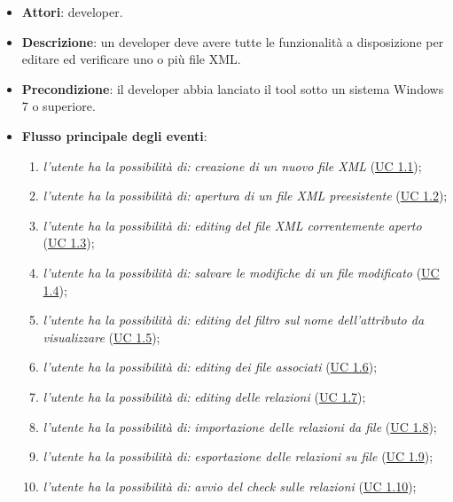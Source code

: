 		\begin{itemize}
			\item\textbf{Attori}: developer.
			\item\textbf{Descrizione}: un developer deve avere tutte le funzionalità a disposizione per editare ed verificare uno o più file XML.
			\item\textbf{Precondizione}: il developer abbia lanciato il tool sotto un sistema Windows 7 o superiore.
			\item\textbf{Flusso principale degli eventi}: 
			\begin{enumerate}
				\item \textit{l'utente ha la possibilità di:} \textit{creazione di un nuovo file XML} (\hyperref[subsec:XEUC1.1]{UC 1.1});
				
				\item \textit{l'utente ha la possibilità di:} \textit{apertura di un file XML preesistente} (\hyperref[subsec:XEUC1.2]{UC 1.2});
				
				\item \textit{l'utente ha la possibilità di:} \textit{editing del file XML correntemente aperto} (\hyperref[subsec:XEUC1.3]{UC 1.3});
				
				\item \textit{l'utente ha la possibilità di:} \textit{salvare le modifiche di un file modificato} (\hyperref[subsec:XEUC1.4]{UC 1.4});
				
				\item \textit{l'utente ha la possibilità di:} \textit{editing del filtro sul nome dell'attributo da visualizzare} (\hyperref[subsec:XEUC1.5]{UC 1.5});
				
				\item \textit{l'utente ha la possibilità di:} \textit{editing dei file associati} (\hyperref[subsec:XEUC1.6]{UC 1.6});
				
				\item \textit{l'utente ha la possibilità di:} \textit{editing delle relazioni} (\hyperref[subsec:XEUC1.7]{UC 1.7});
				
				\item \textit{l'utente ha la possibilità di:} \textit{importazione delle relazioni da file} (\hyperref[subsec:XEUC1.8]{UC 1.8});
				
				\item \textit{l'utente ha la possibilità di:} \textit{esportazione delle relazioni su file} (\hyperref[subsec:XEUC1.9]{UC 1.9});
				
				\item \textit{l'utente ha la possibilità di:} \textit{avvio del check sulle relazioni} (\hyperref[subsec:XEUC1.10]{UC 1.10});
				

\end{enumerate}
\end{itemize}
